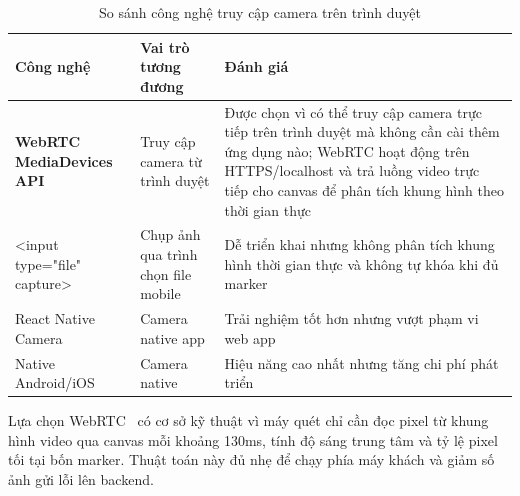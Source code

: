\begin{table}[H]
\centering
\caption{So sánh công nghệ truy cập camera trên trình duyệt}
\label{tab:so-sanh-camera-browser}
\renewcommand{\arraystretch}{1.25}
\begin{tabular}{|
>{\raggedright\arraybackslash}p{3cm}|
>{\raggedright\arraybackslash}p{4.5cm}|
>{\raggedright\arraybackslash}p{7cm}|
}
\hline
\textbf{Công nghệ} & \textbf{Vai trò tương đương} & \textbf{Đánh giá} \\
\hline

\textbf{WebRTC MediaDevices API} &
Truy cập camera từ trình duyệt &
Được chọn vì có thể truy cập camera trực tiếp trên trình duyệt mà không cần cài thêm ứng dụng nào; WebRTC hoạt động trên HTTPS/localhost và trả luồng video trực tiếp cho canvas để phân tích khung hình theo thời gian thực \\
\hline

\parbox[t]{3cm}{
\raggedright
\footnotesize
\ttfamily
\textless input\\
type="file"\\
capture\textgreater
} &
Chụp ảnh qua trình chọn file mobile &
Dễ triển khai nhưng không phân tích khung hình thời gian thực và không tự khóa khi đủ marker \\
\hline

React Native Camera &
Camera native app &
Trải nghiệm tốt hơn nhưng vượt phạm vi web app \\
\hline

Native Android/iOS &
Camera native &
Hiệu năng cao nhất nhưng tăng chi phí phát triển \\
\hline

\end{tabular}
\end{table}

Lựa chọn WebRTC~\cite{webrtc} có cơ sở kỹ thuật vì máy quét chỉ cần đọc pixel từ khung hình video qua canvas mỗi khoảng 130ms, tính độ sáng trung tâm và tỷ lệ pixel tối tại bốn marker. Thuật toán này đủ nhẹ để chạy phía máy khách và giảm số ảnh gửi lỗi lên backend.
